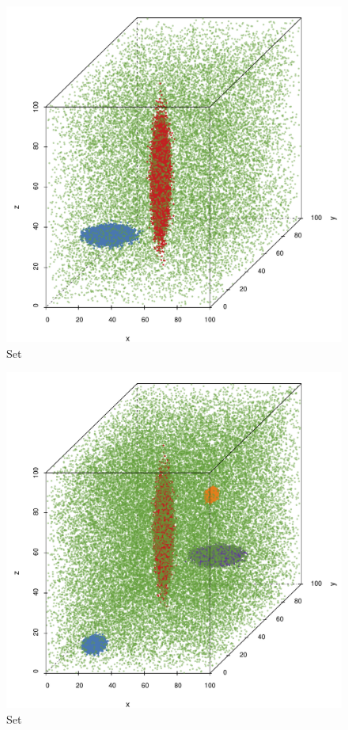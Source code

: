\begin{subfigure}{0.23\textwidth}
	\centering
	\includegraphics[width=\textwidth]{experiment/img/datasetplot_baakman_2_60000}
	\caption{Set \baakmanTwo}
	\label{fig:experiment:multisphere:baakman2}
\end{subfigure}			
\begin{subfigure}{0.23\textwidth}
	\centering
	\includegraphics[width=\textwidth]{experiment/img/datasetplot_baakman_3_120000}
	\caption{Set \baakmanThree}
	\label{fig:experiment:multisphere:baakman3}
\end{subfigure}